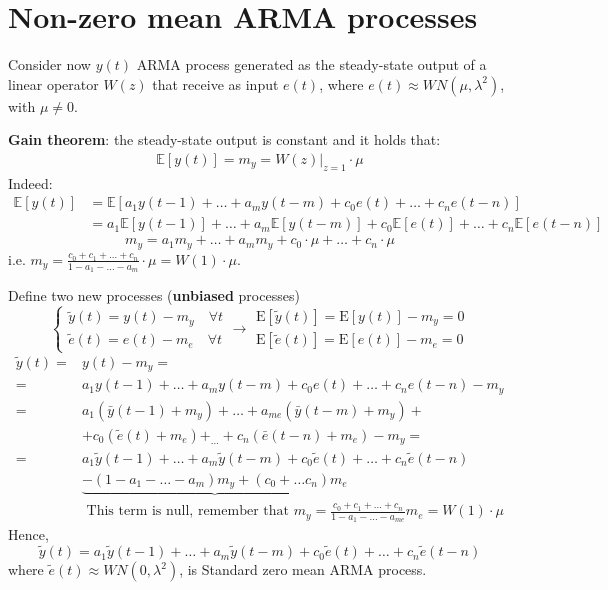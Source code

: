 \section{Non-zero mean ARMA processes}
Consider now $y(t)$ ARMA process generated as the steady-state output of a linear operator $W(z)$ that receive as input $e(t)$, where $e(t) \approx W N\left(\mu, \lambda^{2}\right)$, with $\mu\neq0$.

\textbf{Gain theorem}: the steady-state output is constant and it holds that:
\begin{align*}
	\mathbb{E}[y(t)]=m_{y}=W(z)|_{z=1} \cdot \mu
\end{align*}
Indeed:
\begin{align*}
		\mathbb{E}[y(t)] &=\mathbb{E}\left[a_{1} y(t-1)+\ldots+a_{m} y(t-m)+c_{0} e(t)+\ldots+c_{n} e(t-n)\right] \\
		&=a_{1} \mathbb{E}[y(t-1)]+\ldots+a_{m} \mathbb{E}[y(t-m)]+c_{0} \mathbb{E}[e(t)]+\ldots+c_{n} \mathbb{E}[e(t-n)]
\end{align*}
	$$
	m_{y}=a_{1} m_{y}+\ldots+a_{m} m_{y}+c_{0} \cdot \mu+\ldots+c_{n} \cdot \mu
	$$
	i.e. $m_{y}=\frac{c_{0}+c_{1}+\ldots+c_{n}}{1-a_{1}-\ldots-a_{m}} \cdot \mu=W(1) \cdot \mu$.
	
Define two new processes (\textbf{unbiased} processes)
$$
\left\{\begin{array}{l}
	\tilde{y}(t)=y(t)-m_{y} \quad\forall t\\
	\tilde{e}(t)=e(t)-m_{e} \quad\forall t
\end{array} \rightarrow \begin{array}{l}
	\mathrm{E}[\tilde{y}(t)]=\mathrm{E}[y(t)]-m_{y}=0 \\
	\mathrm{E}[\tilde{e}(t)]=\mathrm{E}[e(t)]-m_{e}=0
\end{array}\right.
$$
\begin{align*}
	\tilde{y}(t)=& y(t)-m_{y}=\\
	=& a_{1} y(t-1)+\ldots+a_{m} y(t-m)+c_{0} e(t)+\ldots+c_{n} e(t-n)-m_{y} \\
	=& a_{1}\left(\bar{y}(t-1)+m_{y}\right)+\ldots+a_{m e}\left(\bar{y}(t-m)+m_{y}\right)+\\
	&+c_{0}\left(\tilde{e}(t)+m_{e}\right)+_{\ldots}+c_{n}\left(\bar{e}(t-n)+m_{e}\right)-m_{y}= \\
	=& a_{1} \tilde{y}(t-1)+\ldots+a_{m} \tilde{y}(t-m)+c_{0} \tilde{e}(t)+\ldots+c_{n} \tilde{e}(t-n) \\
	&\underbrace{-\left(1-a_{1}-\ldots-a_{m}\right) m_{y}+\left(c_{0}+\ldots c_{n}\right) m_{e}} \\
	& \text { This term is null, remember that } m_{y}=\frac{c_{0}+c_{1}+\ldots+c_{n}}{1-a_{1}-\ldots-a_{m e}} m_{e}=W(1) \cdot \mu
\end{align*}
Hence,
$$
\tilde{y}(t)=a_{1} \tilde{y}(t-1)+\ldots+a_{m} \tilde{y}(t-m)+c_{0} \tilde{e}(t)+\ldots+c_{n} \tilde{e}(t-n)
$$
where $\tilde{e}(t)\approx W N\left(0, \lambda^{2}\right)$, is Standard zero mean ARMA process.

